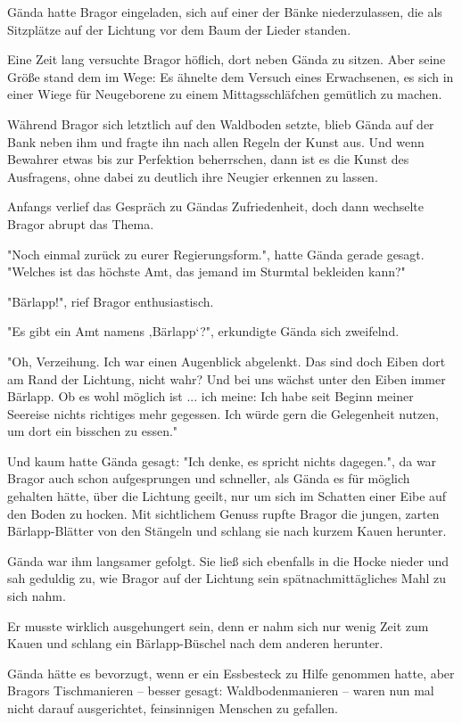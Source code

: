 \documentclass[10pt, a4paper, oneside]{book}
\begin{document}
\begin{multicols}{2}
Gända hatte Bragor eingeladen, sich auf einer der Bänke niederzulassen, die als Sitzplätze auf der Lichtung vor dem Baum der Lieder standen. 

Eine Zeit lang versuchte Bragor höflich, dort neben Gända zu sitzen. Aber seine Größe stand dem im Wege: Es ähnelte dem Versuch eines Erwachsenen, es sich in einer Wiege für Neugeborene zu einem Mittagsschläfchen gemütlich zu machen. 

Während Bragor sich letztlich auf den Waldboden setzte, blieb Gända auf der Bank neben ihm und fragte ihn nach allen Regeln der Kunst aus. Und wenn Bewahrer etwas bis zur Perfektion beherrschen, dann ist es die Kunst des Ausfragens, ohne dabei zu deutlich ihre Neugier erkennen zu lassen. 

Anfangs verlief das Gespräch zu Gändas Zufriedenheit, doch dann wechselte Bragor abrupt das Thema. 

"Noch einmal zurück zu eurer Regierungsform.", hatte Gända gerade gesagt. "Welches ist das höchste Amt, das jemand im Sturmtal bekleiden kann?" 

"Bärlapp!", rief Bragor enthusiastisch.

"Es gibt ein Amt namens ‚Bärlapp‘?", erkundigte Gända sich zweifelnd.

"Oh, Verzeihung. Ich war einen Augenblick abgelenkt. Das sind doch Eiben dort am Rand der Lichtung, nicht wahr? Und bei uns wächst unter den Eiben immer Bärlapp. Ob es wohl möglich ist ... ich meine: Ich habe seit Beginn meiner Seereise nichts richtiges mehr gegessen. Ich würde gern die Gelegenheit nutzen, um dort ein bisschen zu essen." 

Und kaum hatte Gända gesagt: "Ich denke, es spricht nichts dagegen.", da war Bragor auch schon aufgesprungen und schneller, als Gända es für möglich gehalten hätte, über die Lichtung geeilt, nur um sich im Schatten einer Eibe auf den Boden zu hocken. Mit sichtlichem Genuss rupfte Bragor die jungen, zarten Bärlapp-Blätter von den Stängeln und schlang sie nach kurzem Kauen herunter. 

Gända war ihm langsamer gefolgt. Sie ließ sich ebenfalls in die Hocke nieder und sah geduldig zu, wie Bragor auf der Lichtung sein spätnachmittägliches Mahl zu sich nahm. 

Er musste wirklich ausgehungert sein, denn er nahm sich nur wenig Zeit zum Kauen und schlang ein Bärlapp-Büschel nach dem anderen herunter. 

Gända hätte es bevorzugt, wenn er ein Essbesteck zu Hilfe genommen hatte, aber Bragors Tischmanieren – besser gesagt: Waldbodenmanieren – waren nun mal nicht darauf ausgerichtet, feinsinnigen Menschen zu gefallen. 


\end{multicols}
\end{document}
